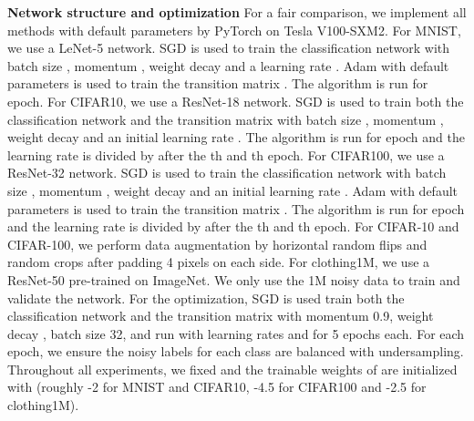\documentclass{article}
\begin{document}
\textbf{Network structure and optimization} For a fair comparison, we implement all methods with default parameters by PyTorch on Tesla V100-SXM2. For MNIST, we use a LeNet-5 network. SGD is used to train the classification network  with batch size , momentum , weight decay  and a learning rate . Adam with default parameters is used to train the transition matrix . The algorithm is run for  epoch. For CIFAR10, we use a ResNet-18 network. SGD is used to train both the classification network  and the transition matrix  with batch size , momentum , weight decay  and an initial learning rate . The algorithm is run for  epoch and the learning rate is divided by  after the th and th epoch. For CIFAR100, we use a ResNet-32 network. SGD is used to train the classification network  with batch size , momentum , weight decay  and an initial learning rate . Adam with default parameters is used to train the transition matrix . The algorithm is run for  epoch and the learning rate is divided by  after the th and th epoch. For CIFAR-10 and CIFAR-100, we perform data augmentation by horizontal random flips and  random crops after padding 4 pixels on each side. For clothing1M, we use a ResNet-50 pre-trained on ImageNet. We only use the 1M noisy data to train and validate the network. For the optimization, SGD is used train both the classification network  and the transition matrix  with momentum 0.9, weight decay , batch size 32, and run with learning rates  and  for 5 epochs each. For each epoch, we ensure the noisy labels for each class are balanced with undersampling. Throughout all experiments, we fixed  and the trainable weights  of  are initialized with  (roughly -2 for MNIST and CIFAR10, -4.5 for CIFAR100 and -2.5 for clothing1M).
\end{document}
